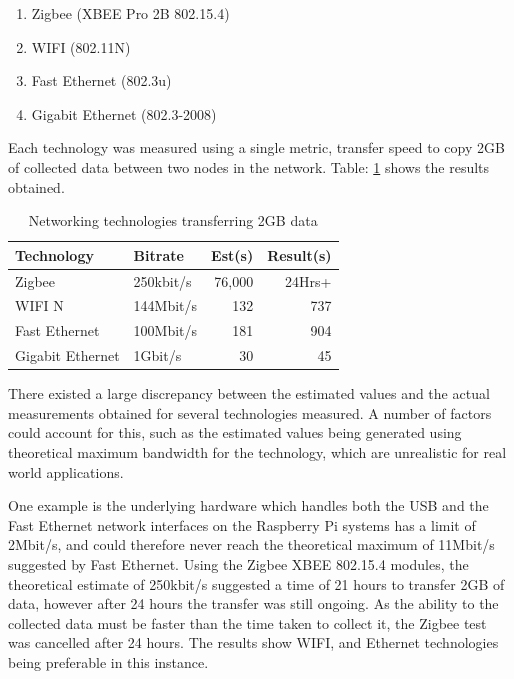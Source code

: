 \begin{enumerate}
	\item Zigbee (XBEE Pro 2B 802.15.4)
	\item WIFI (802.11N)
	\item Fast Ethernet (802.3u)
	\item Gigabit Ethernet (802.3-2008)
\end{enumerate}

Each technology was measured using a single metric, transfer speed to copy 2GB of collected data between two nodes in the network. Table: \ref{tab:network_technologies_transfer_time} shows the results obtained. 

%
\begin{table}
	\centering
	\begin{tabular}{p{3cm} l r r }
		\toprule
		Technology & Bitrate & Est(s) & Result(s)\\ \midrule
		Zigbee & 250kbit/s &  76,000 & 24Hrs+ \\
		WIFI N & 144Mbit/s & 132 & 737\\
		Fast Ethernet & 100Mbit/s & 181 & 904 \\
		Gigabit Ethernet & 1Gbit/s & 30 & 45 \\
		\bottomrule
	\end{tabular}
	\caption{Networking technologies transferring 2GB data}
	\label{tab:network_technologies_transfer_time}
\end{table}
%

There existed a large discrepancy between the estimated values and the actual measurements obtained for several technologies measured. A number of factors could account for this, such as the estimated values being generated using theoretical maximum bandwidth for the technology, which are unrealistic for real world applications.

One example is the underlying hardware which handles both the USB and the Fast Ethernet network interfaces on the Raspberry Pi systems has a limit of 2Mbit/s, and could therefore never reach the theoretical maximum of 11Mbit/s suggested by Fast Ethernet. Using the Zigbee XBEE 802.15.4 modules, the theoretical estimate of 250kbit/s suggested a time of 21 hours to transfer 2GB of data, however after 24 hours the transfer was still ongoing. As the ability to the collected data must be faster than the time taken to collect it, the Zigbee test was cancelled after 24 hours. The results show WIFI, and Ethernet technologies being preferable in this instance.
